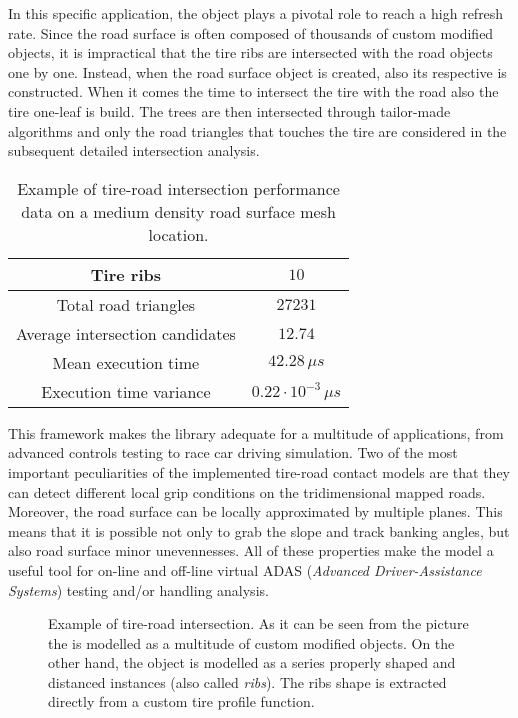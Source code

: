 In this specific application, the \AabbTree{} object plays a pivotal role to reach a high refresh rate. Since the road surface is often composed of thousands of custom modified \Triangle{} objects, it is impractical that the tire ribs are intersected with the road objects one by one. Instead, when the road surface object is created, also its respective \AabbTree{} is constructed. When it comes the time to intersect the tire with the road also the tire one-leaf \AabbTree{} is build. The trees are then intersected through tailor-made algorithms and only the road triangles that touches the tire \Aabb{} are considered in the subsequent detailed intersection analysis.

\renewcommand{\arraystretch}{1}
\begin{table}[!ht]
  \centering
  \begin{tabular}{|c|c|}
    \hline
    Tire ribs               & $10$ \\ \hline
    Total road triangles    & $27231$ \\ \hline
    Average intersection candidates & $12.74$ \\ \hline
    Mean execution time     & $42.28\,\mu s$ \\ \hline
    Execution time variance & $0.22\cdot10^{-3}\,\mu s$ \\ \hline
  \end{tabular}
  \caption{Example of tire-road intersection performance data on a medium density road surface mesh location.}
  \label{table::data}
\end{table}

This framework makes the library adequate for a multitude of applications, from advanced controls testing to race car driving simulation. Two of the most important peculiarities of the implemented tire-road contact models are that they can detect different local grip conditions on the tridimensional mapped roads. Moreover, the road surface can be locally approximated by multiple planes. This means that it is possible not only to grab the slope and track banking angles, but also road surface minor unevennesses. All of these properties make the model a useful tool for on-line and off-line virtual ADAS (\emph{Advanced Driver-Assistance Systems}) testing and/or handling analysis.

\begin{figure}[!ht]
  \centering
  
  \caption{Example of tire-road intersection. As it can be seen from the picture the \Road{} is modelled as a multitude of custom modified \Triangle{} objects. On the other hand, the \Tire{} object is modelled as a series properly shaped and distanced \Disk{} instances (also called \emph{ribs}). The ribs shape is extracted directly from a custom tire profile function.}
  \label{fig::tire}
\end{figure}

